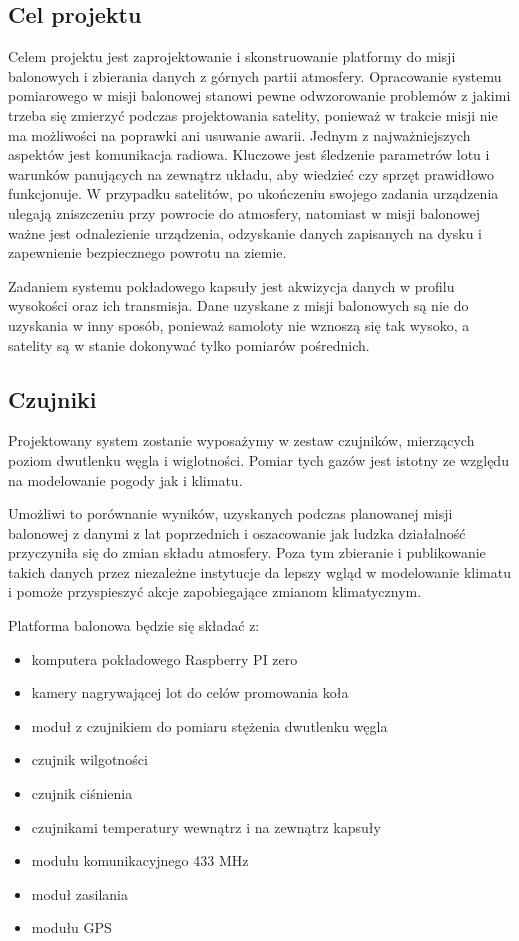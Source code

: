 \documentclass[a4paper,12pt]{article}
\begin{document}
\subsection{Cel projektu}
Celem projektu jest zaprojektowanie i skonstruowanie platformy do misji balonowych i zbierania danych z górnych partii atmosfery. Opracowanie systemu pomiarowego w misji balonowej stanowi pewne odwzorowanie problemów z jakimi trzeba się zmierzyć podczas projektowania satelity, ponieważ w trakcie misji nie ma możliwości na poprawki ani usuwanie awarii. Jednym z najważniejszych aspektów jest komunikacja radiowa. Kluczowe jest śledzenie parametrów lotu i warunków panujących na zewnątrz układu, aby wiedzieć czy sprzęt prawidłowo funkcjonuje. W przypadku satelitów, po ukończeniu swojego zadania urządzenia ulegają zniszczeniu przy powrocie do atmosfery, natomiast w misji balonowej ważne jest odnalezienie urządzenia, odzyskanie danych zapisanych na dysku i zapewnienie bezpiecznego powrotu na ziemie.

Zadaniem systemu pokładowego kapsuły jest akwizycja danych w profilu wysokości oraz ich transmisja. Dane uzyskane z misji balonowych są nie do uzyskania w inny sposób, ponieważ samoloty nie wznoszą się tak wysoko, a satelity są w stanie dokonywać tylko pomiarów pośrednich.

\subsection{Czujniki}
Projektowany system zostanie wyposażymy w zestaw czujników, mierzących poziom dwutlenku węgla i wiglotności. Pomiar tych gazów jest istotny ze względu na modelowanie pogody jak i klimatu. 

Umożliwi to porównanie wyników, uzyskanych podczas planowanej misji balonowej z danymi z lat poprzednich i oszacowanie jak ludzka działalność przyczyniła się do zmian składu atmosfery. Poza tym zbieranie i publikowanie takich danych przez niezależne instytucje da lepszy wgląd w modelowanie klimatu i pomoże przyspieszyć akcje zapobiegające zmianom klimatycznym.

Platforma balonowa będzie się składać z:
\begin{itemize}
 \item komputera pokładowego Raspberry PI zero
 \item kamery nagrywającej lot do celów promowania koła
 \item moduł z czujnikiem do pomiaru stężenia dwutlenku węgla
 \item czujnik wilgotności
 \item czujnik ciśnienia
 \item czujnikami temperatury wewnątrz i na zewnątrz kapsuły
 \item modułu komunikacyjnego 433 MHz
 \item moduł zasilania
 \item modułu GPS
\end{itemize}
\end{document}
